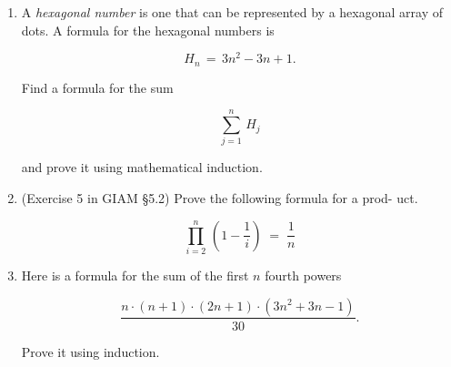 \documentclass{amsart}
\begin{document}
\begin{enumerate}
\vfill

\newpage

\item A {\em hexagonal number} is one that can be represented by a hexagonal
array of dots. A formula for the hexagonal numbers is

\[ H_n \, = \, 3n^2 - 3n + 1. \]

Find a formula for the sum

\[
\sum_{j=1}^n \, H_j 
\] 

\noindent and prove it using mathematical induction.

\vfill

\newpage

\item (Exercise 5 in GIAM \S 5.2) Prove the following formula for a prod-
uct.

\[ \prod_{i=2}^n \, \left( 1 - \frac{1}{i} \right) \; = \; \frac{1}{n}  \]

\vfill

\newpage

\item Here is a formula for the sum of the first $n$ fourth powers

\[ \frac{n \cdot (n + 1) \cdot (2n + 1) \cdot (3n^2 + 3n - 1)}{30}. \]

Prove it using induction.

\vfill


\end{enumerate}
\end{document}
